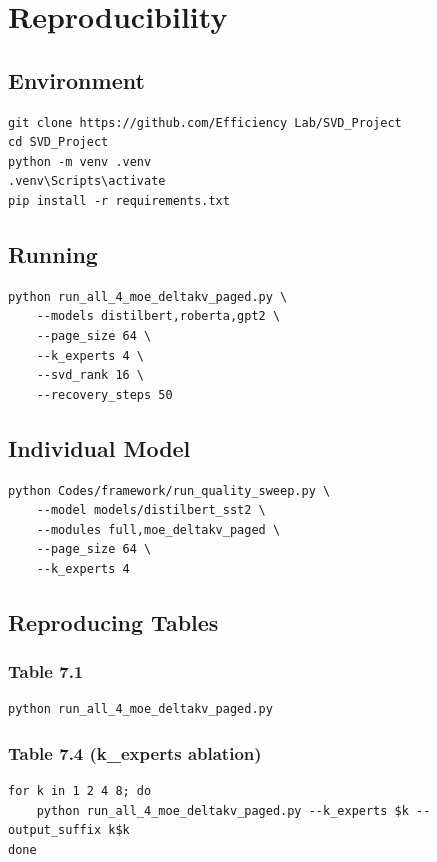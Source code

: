 \section{Reproducibility}

\subsection{Environment}

\begin{lstlisting}
git clone https://github.com/Efficiency Lab/SVD_Project
cd SVD_Project
python -m venv .venv
.venv\Scripts\activate
pip install -r requirements.txt
\end{lstlisting}

\subsection{Running}

\begin{lstlisting}
python run_all_4_moe_deltakv_paged.py \
    --models distilbert,roberta,gpt2 \
    --page_size 64 \
    --k_experts 4 \
    --svd_rank 16 \
    --recovery_steps 50
\end{lstlisting}

\subsection{Individual Model}

\begin{lstlisting}
python Codes/framework/run_quality_sweep.py \
    --model models/distilbert_sst2 \
    --modules full,moe_deltakv_paged \
    --page_size 64 \
    --k_experts 4
\end{lstlisting}

\subsection{Reproducing Tables}

\subsubsection{Table 7.1}
\begin{lstlisting}
python run_all_4_moe_deltakv_paged.py
\end{lstlisting}

\subsubsection{Table 7.4 (k\_experts ablation)}
\begin{lstlisting}
for k in 1 2 4 8; do
    python run_all_4_moe_deltakv_paged.py --k_experts $k --output_suffix k$k
done
\end{lstlisting}

